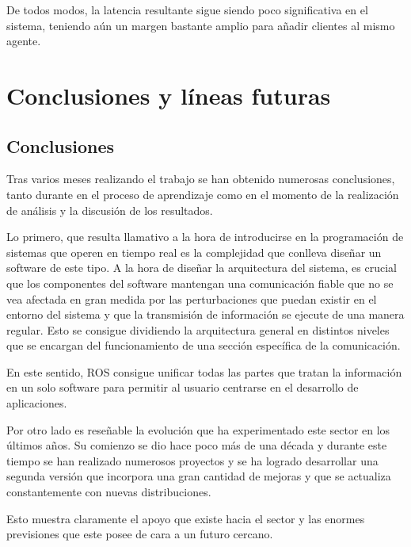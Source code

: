 \documentclass[a4paper,11pt,spanish]{sphinxmanual}
\begin{document}
\sphinxAtStartPar
De todos modos, la latencia resultante sigue siendo poco significativa en el sistema,
teniendo aún un margen bastante amplio para añadir clientes al mismo agente.


\chapter{Conclusiones y líneas futuras}
\label{\detokenize{conclusiones_y_lineas_futuras:conclusiones-y-lineas-futuras}}\label{\detokenize{conclusiones_y_lineas_futuras::doc}}

\section{Conclusiones}
\label{\detokenize{conclusiones_y_lineas_futuras:conclusiones}}
\sphinxAtStartPar
Tras varios meses realizando el trabajo se han obtenido numerosas
conclusiones, tanto durante en el proceso de aprendizaje como
en el momento de la realización de análisis y la discusión de los
resultados.

\sphinxAtStartPar
Lo primero, que resulta llamativo a la hora de introducirse en la
programación de sistemas que operen en tiempo real es la complejidad
que conlleva diseñar un software de este tipo. A la hora de diseñar la
arquitectura del sistema, es crucial que los componentes del
software mantengan una comunicación fiable que no se vea afectada
en gran medida por las perturbaciones que puedan existir en el
entorno del sistema y que la transmisión de información se ejecute
de una manera regular. Esto se consigue dividiendo la arquitectura
general en distintos niveles que se encargan del funcionamiento
de una sección específica de la comunicación.

\sphinxAtStartPar
En este sentido, ROS consigue unificar todas las partes que tratan
la información en un solo software para permitir al usuario centrarse
en el desarrollo de aplicaciones.

\sphinxAtStartPar
Por otro lado es reseñable la evolución que ha experimentado este
sector en los últimos años. Su comienzo se dio hace poco más de
una década y durante este tiempo se han realizado numerosos proyectos y
se ha logrado desarrollar una segunda versión que incorpora una
gran cantidad de mejoras y que se actualiza constantemente con
nuevas distribuciones.

\sphinxAtStartPar
Esto muestra claramente el apoyo que existe hacia el sector y
las enormes previsiones que este posee de cara a un futuro
cercano.
\end{document}
